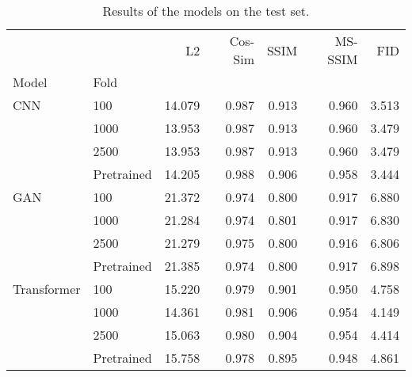\begin{table}
\centering
\caption{Results of the models on the test set.}
\label{tab:results}
\begin{tabular}{llrrrrr}
\toprule
            &            &     L2 &  Cos-Sim &  SSIM &  MS-SSIM &   FID \\
Model & Fold &        &          &       &          &       \\
\midrule
CNN & 100 & 14.079 &    0.987 & 0.913 &    0.960 & 3.513 \\
            & 1000 & 13.953 &    0.987 & 0.913 &    0.960 & 3.479 \\
            & 2500 & 13.953 &    0.987 & 0.913 &    0.960 & 3.479 \\
            & Pretrained & 14.205 &    0.988 & 0.906 &    0.958 & 3.444 \\
GAN & 100 & 21.372 &    0.974 & 0.800 &    0.917 & 6.880 \\
            & 1000 & 21.284 &    0.974 & 0.801 &    0.917 & 6.830 \\
            & 2500 & 21.279 &    0.975 & 0.800 &    0.916 & 6.806 \\
            & Pretrained & 21.385 &    0.974 & 0.800 &    0.917 & 6.898 \\
Transformer & 100 & 15.220 &    0.979 & 0.901 &    0.950 & 4.758 \\
            & 1000 & 14.361 &    0.981 & 0.906 &    0.954 & 4.149 \\
            & 2500 & 15.063 &    0.980 & 0.904 &    0.954 & 4.414 \\
            & Pretrained & 15.758 &    0.978 & 0.895 &    0.948 & 4.861 \\
\bottomrule
\end{tabular}
\end{table}
